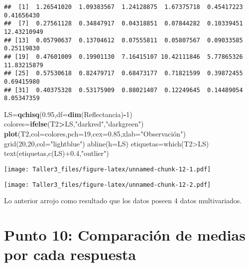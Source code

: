 \documentclass[
]{article}
\newenvironment{Shaded}{\begin{snugshade}}{\end{snugshade}}
\newcommand{\DataTypeTok}[1]{\textcolor[rgb]{0.13,0.29,0.53}{#1}}
\newcommand{\DecValTok}[1]{\textcolor[rgb]{0.00,0.00,0.81}{#1}}
\newcommand{\FloatTok}[1]{\textcolor[rgb]{0.00,0.00,0.81}{#1}}
\newcommand{\KeywordTok}[1]{\textcolor[rgb]{0.13,0.29,0.53}{\textbf{#1}}}
\newcommand{\NormalTok}[1]{#1}
\newcommand{\OperatorTok}[1]{\textcolor[rgb]{0.81,0.36,0.00}{\textbf{#1}}}
\newcommand{\StringTok}[1]{\textcolor[rgb]{0.31,0.60,0.02}{#1}}
\begin{document}
\begin{verbatim}
##  [1]  1.26541020  1.09383567  1.24128875  1.67375718  0.45417223  0.41656430
##  [7]  0.27561128  0.34847917  0.04318851  0.07844282  0.10339451 12.43210949
## [13]  0.05790637  0.13704612  0.07555811  0.05807567  0.09033585  0.25119830
## [19]  0.47601009  0.19901130  7.16415107 10.42111846  5.77865326 11.83215879
## [25]  0.57530618  0.82479717  0.68473177  0.71821599  0.39872455  0.69415980
## [31]  0.40375328  0.53175909  0.88021407  0.12249645  0.14489054  8.05347359
\end{verbatim}

\begin{Shaded}
\begin{Highlighting}[]
\NormalTok{LS=}\KeywordTok{qchisq}\NormalTok{(}\FloatTok{0.95}\NormalTok{,}\DataTypeTok{df=}\KeywordTok{dim}\NormalTok{(Reflectancia)}\OperatorTok{-}\DecValTok{1}\NormalTok{)}
\NormalTok{colores=}\KeywordTok{ifelse}\NormalTok{(T2}\OperatorTok{>}\NormalTok{LS,}\StringTok{"darkred"}\NormalTok{,}\StringTok{"darkgreen"}\NormalTok{)}
\KeywordTok{plot}\NormalTok{(T2,}\DataTypeTok{col=}\NormalTok{colores,}\DataTypeTok{pch=}\DecValTok{19}\NormalTok{,}\DataTypeTok{cex=}\FloatTok{0.85}\NormalTok{,}\DataTypeTok{xlab=}\StringTok{"Observación")}
\StringTok{grid(20,20,col="}\NormalTok{lightblue}\StringTok{")}
\StringTok{abline(h=LS)}
\StringTok{etiquetas=which(T2>LS)}
\StringTok{text(etiquetas,c(LS)+0.4,"}\NormalTok{outlier}\StringTok{")}
\end{Highlighting}
\end{Shaded}

\texttt{[image: Taller3\_files/figure-latex/unnamed-chunk-12-1.pdf]}

\begin{Shaded}
\end{Shaded}

\texttt{[image: Taller3\_files/figure-latex/unnamed-chunk-12-2.pdf]}

Lo anterior arrojo como resultado que los datos poseen 4 datos
multivariados.

\hypertarget{punto-10-comparaciuxf3n-de-medias-por-cada-respuesta}{%
\section{Punto 10: Comparación de medias por cada
respuesta}\label{punto-10-comparaciuxf3n-de-medias-por-cada-respuesta}}
\end{document}
